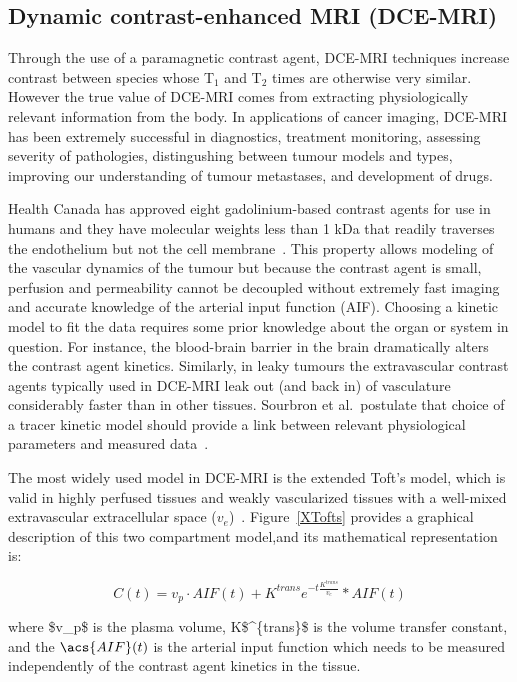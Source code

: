 \subsection{Dynamic contrast-enhanced MRI (\acs{DCE-MRI})}

Through the use of a paramagnetic contrast agent, \acs{DCE-MRI} techniques increase contrast between species whose T$_1$ and T$_2$ times are otherwise very similar.
However the true value of \acs{DCE-MRI} comes from extracting physiologically relevant information from the body. 
In applications of cancer imaging, \acs{DCE-MRI} has been extremely successful in diagnostics, treatment monitoring, assessing severity of pathologies, distingushing between tumour models and types, improving our understanding of tumour metastases, and development of drugs.

Health Canada has approved eight gadolinium-based contrast agents for use in humans and they have molecular weights less than 1 \acs{kDa} that readily traverses the endothelium but not the cell membrane~\cite{WalkerSamuel:2006ch}. 
This property allows modeling of the vascular dynamics of the tumour but because the contrast agent is small, perfusion and permeability cannot be decoupled without extremely fast imaging and accurate knowledge of the arterial input function (\acs{AIF})\cite{Sourbron:2011ce}.
Choosing a kinetic model to fit the data requires some prior knowledge about the organ or system in question. 
For instance, the blood-brain barrier in the brain dramatically alters the contrast agent kinetics. 
Similarly, in leaky tumours the extravascular contrast agents typically used in \acs{DCE-MRI} leak out (and back in) of vasculature considerably faster than in other tissues. 
Sourbron et al.\ postulate that choice of a tracer kinetic model should provide a link between relevant physiological parameters and measured data~\cite{Sourbron:2011ce}. 

The most widely used model in \acs{DCE-MRI} is the extended Toft's model, which is valid in highly perfused tissues and weakly vascularized tissues with a well-mixed extravascular extracellular space ($v_e$)~\cite{Sourbron:2013jz}.
Figure~\ref{XTofts} provides a graphical description of this two compartment model,and its mathematical representation is:

\begin{equation}
C(t) = v_p \cdot AIF(t) + K^{trans}e^{-t\frac{K^{trans}}{v_e}} * AIF(t)
\end{equation}

where \acs{$v_p$} is the plasma volume, \acs{K$^{trans}$} is the volume transfer constant, and the $\acs{AIF}(t)$ is the arterial input function which needs to be measured independently of the contrast agent kinetics in the tissue.

